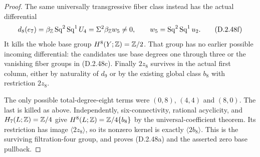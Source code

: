 \begin{proof}
The same universally transgressive fiber class instead has
the actual differential
\[
 d_8(e_7)=\beta_{\mathbb Z}\operatorname{Sq}^2
                       \operatorname{Sq}^1U_4
       =\Sigma^2\beta_{\mathbb Z}w_5\ne0,
 \qquad w_5=\operatorname{Sq}^2\operatorname{Sq}^1u_2.
 \tag{D.2.48f}
\]
It kills the whole base group $H^8(Y;\mathbb Z)=\mathbb Z/2$.
That group has no earlier possible incoming differential:
the candidates use base degrees one through three or the
vanishing fiber groups in \textup{(D.2.48c)}.
Finally $2z_8$ survives in the actual first column, either
by naturality of $d_9$ or by the existing global class $b_8$
with restriction $2z_8$.

The only possible total-degree-eight terms were $(0,8)$,
$(4,4)$ and $(8,0)$. The last is killed as above. Independently,
six-connectivity, rational acyclicity, and $H_7(L;\mathbb Z)=\mathbb Z/4$ give
$H^8(L;\mathbb Z)=\mathbb Z/4\{b_8\}$ by the universal-coefficient
theorem. Its restriction has image $\langle2z_8\rangle$,
so its nonzero kernel is exactly $\langle2b_8\rangle$.
This is the surviving filtration-four group, and proves
\textup{(D.2.48a)} and the asserted zero base pullback.
\end{proof}
